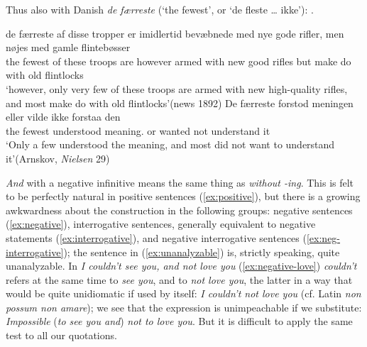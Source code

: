 Thus also with Danish \textit{de færreste} (`the fewest', or `de fleste {\dots} ikke'): .

\ea \label{ex:06-63}
\ea
 \gll de færreste af disse tropper er imidlertid bevæbnede med nye gode rifler, men nøjes med gamle flintebøsser\\
 the fewest of these troops are however armed with new good rifles but {make do} with old flintlocks\\
\glt `however, only very few of these troops are armed with new high-quality rifles, and most make do with old flintlocks'\hfill(news 1892)
\ex 
 \gll De færreste forstod meningen eller vilde ikke forstaa den\\
 the fewest understood meaning.\DEF{} or wanted not understand it\\
\glt `Only a few understood the meaning, and most did not want to understand it'\hfill(Arnskov, \textit{Nielsen} 29) %
\z
\z{}

\textit{And} with a negative infinitive means the same thing as \textit{without -ing}. This is felt to be perfectly natural in positive sentences (\ref{ex:positive}), but there is a growing awkwardness about the construction in the following groups: negative sentences (\ref{ex:negative}), interrogative sentences, generally equivalent to negative statements (\ref{ex:interrogative}), and negative interrogative sentences (\ref{ex:neg-interrogative}); the sentence in (\ref{ex:unanalyzable}) is, strictly speaking, quite unanalyzable. In \textit{I couldn't see you, and not love you} (\ref{ex:negative-love}) \textit{couldn't} refers at the same time to \textit{see you}, and to \textit{not love you}, the latter in a way that would be quite unidiomatic if used by itself: \textit{I couldn't not love you} (cf. Latin \textit{non possum non amare}); we see that the expression is unimpeachable if we substitute: \textit{Impossible} (\textit{to see you and}) \textit{not to love you}. But it is difficult to apply the same test to all our quotations.

